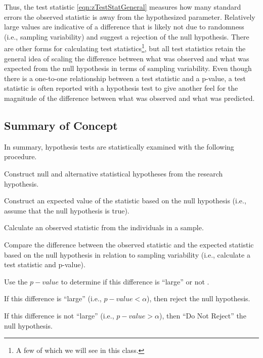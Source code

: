 \documentclass[10pt,openany]{book}\usepackage[]{graphicx}\usepackage[]{color}
\begin{document}
Thus, the test statistic \eqref{eqn:zTestStatGeneral} measures how many standard errors the observed statistic is away from the hypothesized parameter.  Relatively large values are indicative of a difference that is likely not due to randomness (i.e., sampling variability) and suggest a rejection of the null hypothesis.  There are other forms for calculating test statistics\footnote{A few of which we will see in this class.}, but all test statistics retain the general idea of scaling the difference between what was observed and what was expected from the null hypothesis in terms of sampling variability.  Even though there is a one-to-one relationship between a test statistic and a p-value, a test statistic is often reported with a hypothesis test to give another feel for the magnitude of the difference between what was observed and what was predicted.



\subsection{Summary of Concept}
In summary, hypothesis tests are statistically examined with the following procedure.
\begin{Enumerate}
  \item Construct null and alternative statistical hypotheses from the research hypothesis.
  \item Construct an expected value of the statistic based on the null hypothesis (i.e., assume that the null hypothesis is true).
  \item Calculate an observed statistic from the individuals in a sample.
  \item Compare the difference between the observed statistic and the expected statistic based on the null hypothesis in relation to sampling variability (i.e., calculate a test statistic and p-value).
  \item Use the $p-value$ to determine if this difference is ``large'' or not .
  \begin{Itemize}
    \item If this difference is ``large'' (i.e., $p-value<\alpha$), then reject the null hypothesis.
    \item If this difference is not ``large'' (i.e., $p-value>\alpha$), then ``Do Not Reject'' the null hypothesis.
  \end{Itemize}
\end{Enumerate}
\end{document}
